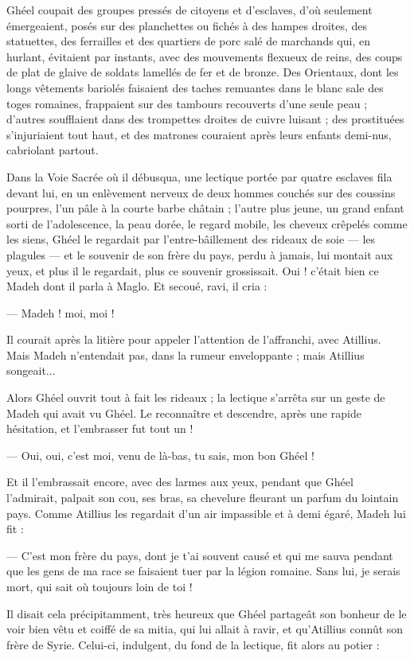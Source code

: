 \documentclass[a4paper, 11pt, oneside, polutonikogreek, french]{article}
\begin{document}
Ghéel coupait des groupes pressés de citoyens et d'esclaves, d'où seulement émergeaient, posés sur des planchettes ou fichés à des hampes droites, des statuettes, des ferrailles et des quartiers de porc salé de marchands qui, en hurlant, évitaient par instants, avec des mouvements flexueux de reins, des coups de plat de glaive de soldats lamellés de fer et de bronze. Des Orientaux, dont les longs vêtements bariolés faisaient des taches remuantes dans le blanc sale des toges romaines, frappaient sur des tambours recouverts d'une seule peau ; d'autres soufflaient dans des trompettes droites de cuivre luisant ; des prostituées s'injuriaient tout haut, et des matrones couraient après leurs enfants demi-nus, cabriolant partout.

Dans la Voie Sacrée où il débusqua, une lectique portée par quatre esclaves fila devant lui, en un enlèvement nerveux de deux hommes couchés sur des coussins pourpres, l'un pâle à la courte barbe châtain ; l'autre plus jeune, un grand enfant sorti de l'adolescence, la peau dorée, le regard mobile, les cheveux crêpelés comme les siens, Ghéel le regardait par l'entre-bâillement des rideaux de soie --- les plagules --- et le souvenir de son frère du pays, perdu à jamais, lui montait aux yeux, et plus il le regardait, plus ce souvenir grossissait. Oui ! c'était bien ce Madeh dont il parla à Maglo. Et secoué, ravi, il cria :

--- Madeh ! moi, moi !

Il courait après la litière pour appeler l'attention de l'affranchi, avec Atillius. Mais Madeh n'entendait pas, dans la rumeur enveloppante ; mais Atillius songeait...

Alors Ghéel ouvrit tout à fait les rideaux ; la lectique s'arrêta sur un geste de Madeh qui avait vu Ghéel. Le reconnaître et descendre, après une rapide hésitation, et l'embrasser fut tout un !

--- Oui, oui, c'est moi, venu de là-bas, tu sais, mon bon Ghéel !

Et il l'embrassait encore, avec des larmes aux yeux, pendant que Ghéel l'admirait, palpait son cou, ses bras, sa chevelure fleurant un parfum du lointain pays. Comme Atillius les regardait d'un air impassible et à demi égaré, Madeh lui fit :

--- C'est mon frère du pays, dont je t'ai souvent causé et qui me sauva pendant que les gens de ma race se faisaient tuer par la légion romaine. Sans lui, je serais mort, qui sait où toujours loin de toi !

Il disait cela précipitamment, très heureux que Ghéel partageât son bonheur de le voir bien vêtu et coiffé de sa mitia, qui lui allait à ravir, et qu'Atillius connût son frère de Syrie. Celui-ci, indulgent, du fond de la lectique, fit alors au potier :
\end{document}
